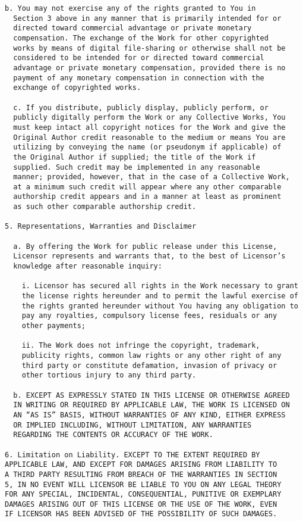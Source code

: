 \begin{Verbatim}[fontsize=\footnotesize]
  b. You may not exercise any of the rights granted to You in
  Section 3 above in any manner that is primarily intended for or
  directed toward commercial advantage or private monetary
  compensation. The exchange of the Work for other copyrighted
  works by means of digital file-sharing or otherwise shall not be
  considered to be intended for or directed toward commercial
  advantage or private monetary compensation, provided there is no
  payment of any monetary compensation in connection with the
  exchange of copyrighted works.
  
  c. If you distribute, publicly display, publicly perform, or
  publicly digitally perform the Work or any Collective Works, You
  must keep intact all copyright notices for the Work and give the
  Original Author credit reasonable to the medium or means You are
  utilizing by conveying the name (or pseudonym if applicable) of
  the Original Author if supplied; the title of the Work if
  supplied. Such credit may be implemented in any reasonable
  manner; provided, however, that in the case of a Collective Work,
  at a minimum such credit will appear where any other comparable
  authorship credit appears and in a manner at least as prominent
  as such other comparable authorship credit.

5. Representations, Warranties and Disclaimer

  a. By offering the Work for public release under this License,
  Licensor represents and warrants that, to the best of Licensor’s
  knowledge after reasonable inquiry:
    
    i. Licensor has secured all rights in the Work necessary to grant
    the license rights hereunder and to permit the lawful exercise of
    the rights granted hereunder without You having any obligation to
    pay any royalties, compulsory license fees, residuals or any
    other payments;
    
    ii. The Work does not infringe the copyright, trademark,
    publicity rights, common law rights or any other right of any
    third party or constitute defamation, invasion of privacy or
    other tortious injury to any third party.
  
  b. EXCEPT AS EXPRESSLY STATED IN THIS LICENSE OR OTHERWISE AGREED
  IN WRITING OR REQUIRED BY APPLICABLE LAW, THE WORK IS LICENSED ON
  AN “AS IS” BASIS, WITHOUT WARRANTIES OF ANY KIND, EITHER EXPRESS
  OR IMPLIED INCLUDING, WITHOUT LIMITATION, ANY WARRANTIES
  REGARDING THE CONTENTS OR ACCURACY OF THE WORK.

6. Limitation on Liability. EXCEPT TO THE EXTENT REQUIRED BY
APPLICABLE LAW, AND EXCEPT FOR DAMAGES ARISING FROM LIABILITY TO
A THIRD PARTY RESULTING FROM BREACH OF THE WARRANTIES IN SECTION
5, IN NO EVENT WILL LICENSOR BE LIABLE TO YOU ON ANY LEGAL THEORY
FOR ANY SPECIAL, INCIDENTAL, CONSEQUENTIAL, PUNITIVE OR EXEMPLARY
DAMAGES ARISING OUT OF THIS LICENSE OR THE USE OF THE WORK, EVEN
IF LICENSOR HAS BEEN ADVISED OF THE POSSIBILITY OF SUCH DAMAGES.


\end{Verbatim}
